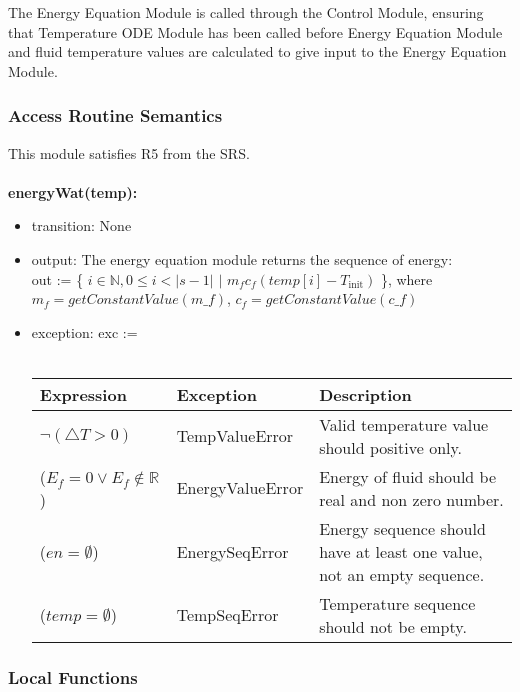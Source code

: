 \documentclass[12pt, titlepage]{article}
\begin{document}
The Energy Equation Module is called through the Control Module, ensuring that Temperature ODE Module has been called before Energy Equation Module and fluid temperature values are calculated to give input to the Energy Equation Module.

\subsubsection{Access Routine Semantics}
This module satisfies R5 from the SRS. \\ \\
\noindent \textbf{energyWat(temp):}
\begin{itemize}
\item transition: None
\item output: The energy equation module returns the sequence of energy: \\ out := \{ $i \in \mathbb{N}, 0 \le i < |s-1|$ $ | $ $m_f c_f (temp[i] - T_\text{init})$   \}, where $m_f = getConstantValue(m\_f) $, $c_f = getConstantValue(c\_f)$

\item exception: exc := \\ \\
 \begin{tabular}{p{5cm} p{3.5cm} p{5.5cm}}
 \hline
 \textbf{Expression} & \textbf{Exception} & \textbf{Description} \\
  \hline
  $\neg ( \triangle T > 0 ) $ & TempValueError & Valid temperature value should positive only. \\ 
  \hline
    ($E_f = 0 \vee E_f \notin \mathbb{R}$) & EnergyValueError & Energy of fluid should be real and non zero number.   \\
    \hline 
        ($en = \emptyset $) & EnergySeqError & Energy sequence should have at least one value, not an empty sequence. \\ 
    \hline
    ($temp = \emptyset $) & TempSeqError & Temperature sequence should not be empty. \\ 
    \hline
 \end{tabular}
 
\end{itemize}

\subsubsection{Local Functions}
\end{document}
